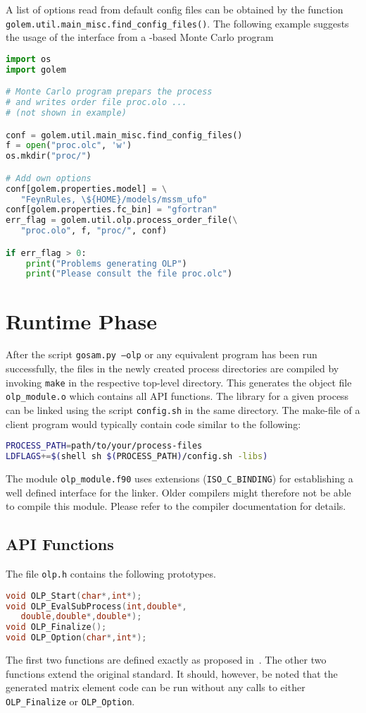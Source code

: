 A list of options read from default config files can be obtained by
the function
\texttt{golem.util.main\_misc.find\_config\_files()}. The following
example suggests the usage of the interface from a \python{}-based
Monte Carlo program
\begin{lstlisting}[language=python]
import os
import golem

# Monte Carlo program prepars the process
# and writes order file proc.olo ...
# (not shown in example)

conf = golem.util.main_misc.find_config_files()
f = open("proc.olc", 'w')
os.mkdir("proc/")

# Add own options
conf[golem.properties.model] = \
   "FeynRules, \${HOME}/models/mssm_ufo"
conf[golem.properties.fc_bin] = "gfortran"
err_flag = golem.util.olp.process_order_file(\
   "proc.olo", f, "proc/", conf)

if err_flag > 0:
    print("Problems generating OLP")
    print("Please consult the file proc.olc")
\end{lstlisting}


\section{Runtime Phase}

After the script \texttt{gosam.py --olp} or any equivalent program has been
run successfully, the files in the newly created process directories are
compiled by invoking \texttt{make} in the respective top-level directory.
This generates the object file \texttt{olp\_module.o} which contains all
API functions. The library for a given process can be linked using the
script \texttt{config.sh} in the same directory. The make-file of a client
program would typically contain code similar to the following:
\begin{lstlisting}[language=bash]
PROCESS_PATH=path/to/your/process-files
LDFLAGS+=$(shell sh $(PROCESS_PATH)/config.sh -libs)
\end{lstlisting}

\attention The module \texttt{olp\_module.f90} uses \fortranMMIII{}
extensions (\texttt{ISO\_C\_BINDING}) for establishing a well defined
interface for the linker. Older \fortranXC{} compilers might therefore
not be able to compile this module. Please refer to the compiler documentation
for details.

\subsection{API Functions}
\lstset{language=C}
The file \texttt{olp.h} contains the following prototypes.
\begin{lstlisting}[language=C]
void OLP_Start(char*,int*);
void OLP_EvalSubProcess(int,double*,
   double,double*,double*);
void OLP_Finalize();
void OLP_Option(char*,int*);
\end{lstlisting}
The first two functions are defined exactly as proposed
in~\cite{Binoth:2010xt}. The other two functions extend the original
standard. It should, however, be noted that the generated matrix element code
can be run without any calls to either \lstinline!OLP_Finalize!
or \lstinline!OLP_Option!.

